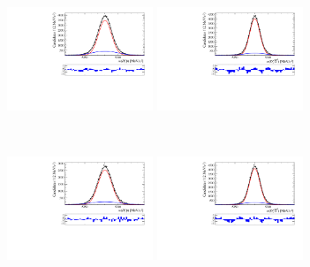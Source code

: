 \begin{figure}[!h]
    \centering
    \begin{subfigure}[t]{1.0\textwidth}
        \includegraphics[width=0.48\textwidth]{figs/B2DsPhi/Plot_signal_Fit_All_B2PhiDs_Ds2KKPi.pdf}
        \includegraphics[width=0.48\textwidth]{figs/B2DsPhi/Plot_signal_Fit_All_B2D0Ds_Ds2KKPi.pdf}
        \caption{\decay{\Dsp}{\Kp\Km\pip}}
    \end{subfigure}\\
    \begin{subfigure}[t]{1.0\textwidth}
        \includegraphics[width=0.48\textwidth]{figs/B2DsPhi/Plot_signal_Fit_All_B2PhiDs_Ds2KPiPi.pdf}
        \includegraphics[width=0.48\textwidth]{figs/B2DsPhi/Plot_signal_Fit_All_B2D0Ds_Ds2KPiPi.pdf}

\end{subfigure}
\end{figure}
